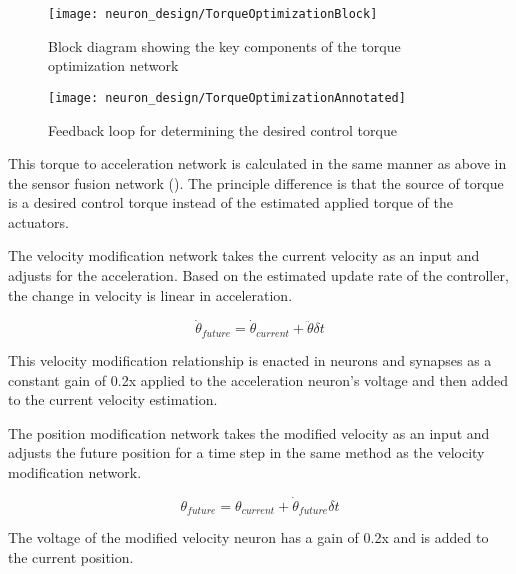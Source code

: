 \begin{figure}
\centering
\texttt{[image: neuron\_design/TorqueOptimizationBlock]}
\caption{Block diagram showing the key components of the torque optimization network}
\label{fig:TorqueOptimizationBlock}
\end{figure}

\begin{figure}
\centering
\texttt{[image: neuron\_design/TorqueOptimizationAnnotated]}
\caption{Feedback loop for determining the desired control torque}
\label{fig:TorqueOptimizationNetwork}
\end{figure}



This torque to acceleration network is calculated in the same manner as above in the sensor fusion network
().
The principle difference is that the source of torque is a desired control
torque instead of the estimated applied torque of the actuators.


The velocity modification network takes the current velocity as an input and adjusts for
the acceleration. Based on the estimated update rate of the controller, the
change in velocity is linear in acceleration.

\begin{equation}
\dot{\theta}_{future} = \dot{\theta}_{current} + \ddot{\theta} \delta t
\end{equation}

This velocity modification relationship is enacted in neurons and synapses as a constant gain of 0.2x applied to the acceleration neuron's voltage and then added to the current velocity estimation.


The position modification network takes the modified velocity as an input and adjusts the
future position for a time step in the same method as the velocity modification
network.

\begin{equation}
\theta_{future} = \theta_{current} + \dot{\theta}_{future} \delta t
\end{equation}

The voltage of the modified velocity neuron has a gain of 0.2x and is added to the current position.


